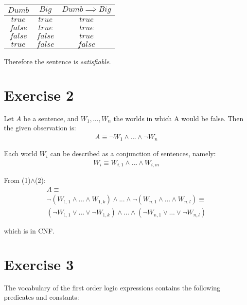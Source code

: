\begin{center}
\begin{tabular}{| c | c | c |}
\hline
$Dumb$ & $Big$ & $Dumb \implies Big$ \\
\hline
$true$ & $true$ & $true$ \\
\hline
$false$ & $true$ & $true$ \\
\hline
$false$ & $false$ & $true$ \\
\hline
$true$ & $false$ & $false$ \\
\hline
\end{tabular}
\end{center}

Therefore the sentence is \textit{satisfiable}.

\section*{Exercise 2}

Let $A$ be a sentence, and $W_1,...,W_n$ the worlds in which A would be false. Then the given observation is:
\smallskip
\begin{gather}
A \equiv \neg W_1 \land ... \land \neg W_n
\end{gather}

Each world $W_i$ can be described as a conjunction of sentences, namely: 
\smallskip
\begin{gather}
W_i \equiv W_{i,1} \land ... \land W_{i,m}
\end{gather}

From (1)$\land$(2):
\smallskip
\begin{gather*}
A \equiv \\ 
\neg (W_{1,1} \land ... \land W_{1,k}) \land ... \land \neg (W_{n,1} \land ... \land W_{n,l}) \equiv \\
(\neg W_{1,1} \lor ... \lor \neg W_{1,k}) \land ... \land (\neg W_{n,1} \lor ... \lor \neg W_{n,l})
\end{gather*}

which is in CNF.

\section*{Exercise 3}

The vocabulary of the first order logic expressions contains the following predicates and constants:

